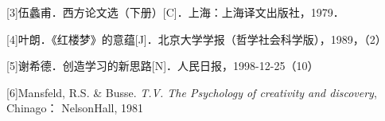 \documentclass[zihao=-4]{ctexart}
\begin{document}

[3]伍蠡甫．西方论文选（下册）[C]．上海：上海译文出版社，1979．

[4]叶朗．《红楼梦》的意蕴[J]．北京大学学报（哲学社会科学版），1989，（2）

[5]谢希德．创造学习的新思路[N]．人民日报，1998-12-25（10）

[6]Mansfeld, R.S. \& Busse. \textit{T.V. The Psychology of creativity and discovery}, Chinago：
NelsonHall, 1981




% 
\end{document}
